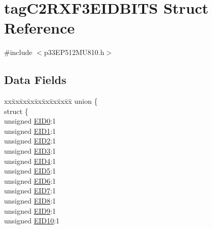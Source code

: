 \hypertarget{structtag_c2_r_x_f3_e_i_d_b_i_t_s}{}\section{tag\+C2\+R\+X\+F3\+E\+I\+D\+B\+I\+TS Struct Reference}
\label{structtag_c2_r_x_f3_e_i_d_b_i_t_s}


{\ttfamily \#include $<$p33\+E\+P512\+M\+U810.\+h$>$}

\subsection*{Data Fields}
\begin{DoxyCompactItemize}
\item 
\begin{tabbing}
xx\=xx\=xx\=xx\=xx\=xx\=xx\=xx\=xx\=\kill
union \{\\
\>struct \{\\
\>\>unsigned \hyperlink{structtag_c2_r_x_f3_e_i_d_b_i_t_s_a9da8b7b30247e4f9cd8cc056549aa9fd}{EID0}:1\\
\>\>unsigned \hyperlink{structtag_c2_r_x_f3_e_i_d_b_i_t_s_afd6c139491d147c1262f3d051c6691e9}{EID1}:1\\
\>\>unsigned \hyperlink{structtag_c2_r_x_f3_e_i_d_b_i_t_s_a36ec62d8d3c5acd5d15e6691dc099a94}{EID2}:1\\
\>\>unsigned \hyperlink{structtag_c2_r_x_f3_e_i_d_b_i_t_s_ab895f7d0ac289a0383b607cbc62eebe2}{EID3}:1\\
\>\>unsigned \hyperlink{structtag_c2_r_x_f3_e_i_d_b_i_t_s_a136d5a709d6618d40acceccb43036656}{EID4}:1\\
\>\>unsigned \hyperlink{structtag_c2_r_x_f3_e_i_d_b_i_t_s_a8dffb2d86a6c184df505ae7c71a58710}{EID5}:1\\
\>\>unsigned \hyperlink{structtag_c2_r_x_f3_e_i_d_b_i_t_s_af8a8574102515d8f1a4b7fd1685d0532}{EID6}:1\\
\>\>unsigned \hyperlink{structtag_c2_r_x_f3_e_i_d_b_i_t_s_a84c3262e67f8d5fd387ac10bde6fa9b1}{EID7}:1\\
\>\>unsigned \hyperlink{structtag_c2_r_x_f3_e_i_d_b_i_t_s_acca25e0b7d86eb499d01f85222baea87}{EID8}:1\\
\>\>unsigned \hyperlink{structtag_c2_r_x_f3_e_i_d_b_i_t_s_ac6748f73d4ada8538b06548be4f396c2}{EID9}:1\\
\>\>unsigned \hyperlink{structtag_c2_r_x_f3_e_i_d_b_i_t_s_a9cea8e77ecbb72bd3b08102412793725}{EID10}:1\\

\end{tabbing}
\end{DoxyCompactItemize}
